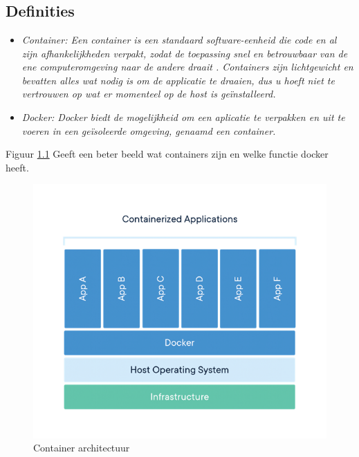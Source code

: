\chapter{}%
\label{ch:stand-van-zaken}


\section{Definities}

\begin{itemize}
    \item \textit{Container: Een container is een standaard software-eenheid die code en al zijn afhankelijkheden verpakt, zodat de toepassing snel en betrouwbaar van de ene computeromgeving naar de andere draait \autocite{Docker-2023}. Containers zijn lichtgewicht en bevatten alles wat nodig is om de applicatie te draaien, dus u hoeft niet te vertrouwen op wat er momenteel op de host is geïnstalleerd. \autocite{DockerDocs-2023} }
    \item \textit{Docker: Docker biedt de mogelijkheid om een aplicatie te verpakken en uit te voeren in een geïsoleerde omgeving, genaamd een container.  \autocite{DockerDocs-2023} }
\end{itemize}

Figuur \ref{fig:KubernetesContainers} Geeft een beter beeld wat containers zijn en welke functie docker heeft.

\begin{flushleft}
    \begin{figure}[h]
        \includegraphics[width=.49\textwidth]{graphics/container.png}
        \caption{\label{fig:KubernetesContainers}Container architectuur \autocite{Docker-2023}}
    \end{figure} 
\end{flushleft}

